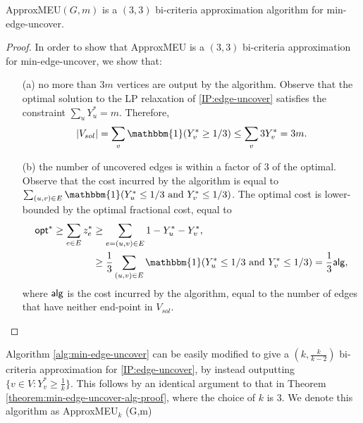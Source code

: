\begin{theorem} \label{theorem:min-edge-uncover-alg-proof}
{\sf ApproxMEU}$(G,m)$ is a $(3,3)$ bi-criteria approximation algorithm for {\sf min-edge-uncover}.
\end{theorem}
\begin{proof}
In order to show that {\sf ApproxMEU} is a $(3,3)$ bi-criteria approximation for {\sf min-edge-uncover}, we show that:
\begin{enumerate}
    \item[(a)] no more than $3m$ vertices are output by the algorithm. Observe that the optimal solution to the LP relaxation of \ref{IP:edge-uncover} satisfies the constraint $\sum_u Y_u^* = m$. Therefore,
    \begin{equation*}
        |V_{sol}| = \sum_v \mathbbm{1} (Y_v^* \ge 1/3) \le \sum_v 3Y_v^* = 3m.
    \end{equation*}
    \item[(b)] the number of uncovered edges is within a factor of $3$ of the optimal. Observe that the cost incurred by the algorithm is equal to $\sum_{(u,v) \in E} \mathbbm{1} (Y_u^* \le 1/3 \text{ and } Y_v^* \le 1/3)$. The optimal cost is lower-bounded by the optimal fractional cost, equal to
\begin{align*}
    \opt^* \ge \sum_{e \in E} z_e^* &\ge \sum_{e = (u,v) \in E} 1 - Y_u^* - Y_v^*, \\
    &\ge \frac{1}{3} \sum_{(u,v) \in E} \mathbbm{1} (Y_u^* \le 1/3 \text{ and } Y_v^* \le 1/3) = \frac{1}{3} \alg,
\end{align*}
where $\mathsf{alg}$ is the cost incurred by the algorithm, equal to the number of edges that have neither end-point in $V_{sol}$.
\end{enumerate}
\end{proof}

\begin{remark}
Algorithm \ref{alg:min-edge-uncover} can be easily modified to give a $\left( k,\frac{k}{k-2} \right)$ bi-criteria approximation for \ref{IP:edge-uncover}, by instead outputting $\{ v \in V : Y_v^* \ge \frac1k\}$. This follows by an identical argument to that in Theorem \ref{theorem:min-edge-uncover-alg-proof}, where the choice of $k$ is $3$. We denote this algorithm as {\sf ApproxMEU$_k$ (G,m)}
\end{remark}

